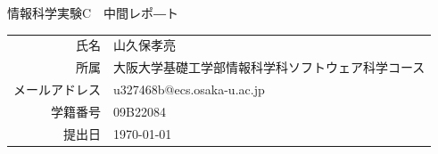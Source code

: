 \documentclass[dvipdfmx]{jarticle}
\begin{document}
\begin{titlepage}
    \begin{center}
        {\huge 情報科学実験C　中間レポ―ト}
        \vspace{180pt}\\
        \begin{tabular}{rl}
            氏名 & 山久保孝亮\\
            所属 & 大阪大学基礎工学部情報科学科ソフトウェア科学コース\\
            メールアドレス & u327468b@ecs.osaka-u.ac.jp\\
            学籍番号 & 09B22084\\
            提出日 & \today\\
        \end{tabular}
    \end{center}
\end{titlepage}
\end{document}

